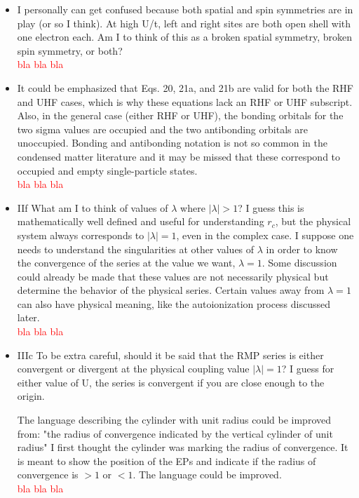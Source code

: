 \documentclass[10pt]{letter}
\newcommand{\alert}[1]{\textcolor{red}{#1}}
\begin{document}
\begin{letter}
\begin{itemize}
\item 
{I personally can get confused because both spatial and spin symmetries are in play (or so I think). At high U/t, left and right sites are both open shell with one electron each. Am I to think of this as a broken spatial symmetry, broken spin symmetry, or both?}
	\\
	\alert{bla bla bla}

\item 
{It could be emphasized that Eqs. 20, 21a, and 21b are valid for both the RHF and UHF cases, which is why these equations lack an RHF or UHF subscript. Also, in the general case (either RHF or UHF), the bonding orbitals for the two sigma values are occupied and the two antibonding orbitals are unoccupied. Bonding and antibonding notation is not so common in the condensed matter literature and it may be missed that these correspond to occupied and empty single-particle states.}
	\\
	\alert{bla bla bla}


\item 
{IIf
What am I to think of values of $\lambda$ where $|\lambda|>1$? I guess this is mathematically well defined and useful for understanding $r_c$, but the physical system always corresponds to $|\lambda|=1$, even in the complex case. I suppose one needs to understand the singularities at other values of $\lambda$ in order to know the convergence of the series at the value we want, $\lambda = 1$. Some discussion could already be made that these values are not necessarily physical but determine the behavior of the physical series. Certain values away from $\lambda=1$ can also have physical meaning, like the autoionization process discussed later.}
	\\
	\alert{bla bla bla}


\item 
{IIIc
To be extra careful, should it be said that the RMP series is either convergent or divergent at the physical coupling value $|\lambda|=1$? I guess for either value of U, the series is convergent if you are close enough to the origin.}

The language describing the cylinder with unit radius could be improved from: "the radius of convergence indicated by the vertical cylinder of unit radius" I first thought the cylinder was marking the radius of convergence. It is meant to show the position of the EPs and indicate if the radius of convergence is $>1$ or $<1$. The language could be improved.
	\\
	\alert{bla bla bla}



\end{itemize}
\end{letter}
\end{document}
